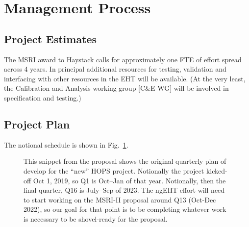 %
%
\section{Management Process}
\label{sec:managementprocess}

\subsection{Project Estimates}

The MSRI award to Haystack calls for approximately one FTE of effort spread across 4 years.  In principal additional resources for testing, validation and interfacing with other resources in the EHT will be available.  (At the very least, the Calibration and Analysis working group [C\&E-WG] will be involved in specification and testing.)



\subsection{Project Plan}

The notional schedule is shown in Fig.~\ref{fig:prop-quarterly}.

\begin{figure}[!h]
  \captionsetup{width=0.6\linewidth}
  \caption[Proposed Quarterly Plan]{This snippet from the proposal shows the original quarterly plan of develop for the ``new'' HOPS project.  Notionally the project kicked-off Oct 1, 2019, so Q1 is Oct--Jan of that year.  Notionally, then the final quarter, Q16 is July--Sep of 2023. The \ac{ngEHT} effort will need to start working on the MSRI-II proposal around Q13 (Oct-Dec 2022), so our goal for that point is to be completing whatever work is necessary to be shovel-ready for the proposal.}
\label{fig:prop-quarterly}
\end{figure}

